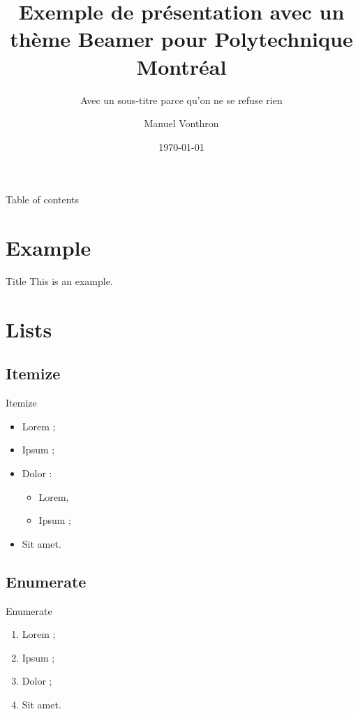 \documentclass{beamer}
\begin{document}
\title[Th\`eme Beamer Polymtl]{Exemple de pr\'esentation avec un th\`eme Beamer pour Polytechnique Montr\'eal} 
\subtitle{Avec un sous-titre parce qu'on ne se refuse rien}
\author{Manuel Vonthron} 
\date{\today} 

\begin{frame}[plain]
  \titlepage
\end{frame}


\begin{frame}{Table of contents}
  \tableofcontents
\end{frame}


\section{Example} 
\begin{frame}{Title} 
  This is an example.
\end{frame}


\section{Lists} 
\subsection{Itemize}

\begin{frame}{Itemize}
  \begin{itemize}
    \item Lorem ; \pause
    \item Ipsum ;
    \item Dolor : \pause
      \begin{itemize}
        \item Lorem,
        \item Ipsum ;
      \end{itemize}
    \item Sit amet.
  \end{itemize} 
\end{frame}


\subsection{Enumerate}
\begin{frame}{Enumerate}
  \begin{enumerate}
    \item Lorem ; \pause
    \item Ipsum ;
    \item Dolor ;
    \item Sit amet.
  \end{enumerate}
\end{frame}
\end{document}
